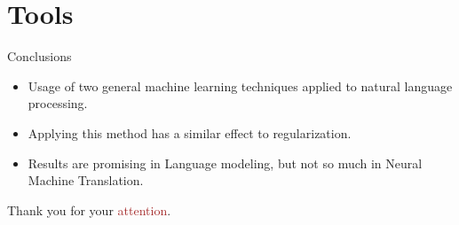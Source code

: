 \documentclass[aspectratio=169]{beamer}
\begin{document}
\section{Tools}
\begin{frame}{Conclusions}

  \begin{itemize}
    \item Usage of two general machine learning techniques applied to natural language processing.
    \item Applying this method has a similar effect to regularization.
    \item Results are promising in Language modeling, but not so much in Neural Machine Translation.
  \end{itemize}
\end{frame}

\appendix

\begin{frame}
  Thank you for your \textcolor{brown}{attention}.
\end{frame}


\begin{frame}[noframenumbering]

  \vspace{0.5cm}
  
  

\end{frame}
\end{document}
